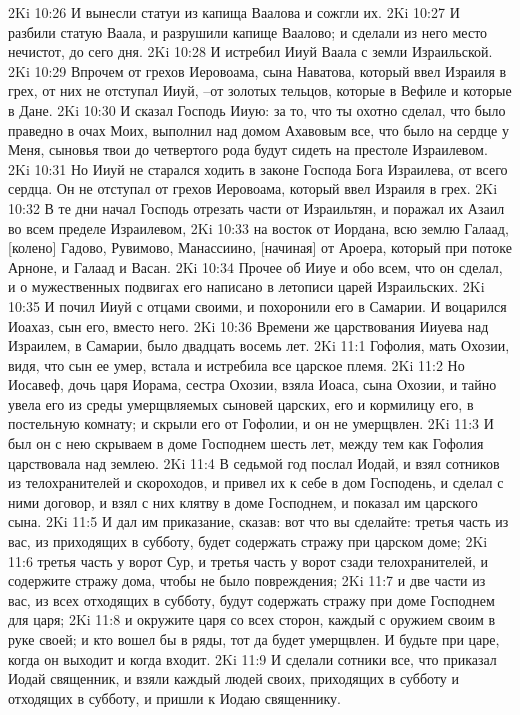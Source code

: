 2Ki 10:26  И вынесли статуи из капища Ваалова и сожгли их.
2Ki 10:27  И разбили статую Ваала, и разрушили капище Ваалово; и сделали из него место нечистот, до сего дня.
2Ki 10:28  И истребил Ииуй Ваала с земли Израильской.
2Ki 10:29  Впрочем от грехов Иеровоама, сына Наватова, который ввел Израиля в грех, от них не отступал Ииуй, --от золотых тельцов, которые в Вефиле и которые в Дане.
2Ki 10:30  И сказал Господь Ииую: за то, что ты охотно сделал, что было праведно в очах Моих, выполнил над домом Ахавовым все, что было на сердце у Меня, сыновья твои до четвертого рода будут сидеть на престоле Израилевом.
2Ki 10:31  Но Ииуй не старался ходить в законе Господа Бога Израилева, от всего сердца. Он не отступал от грехов Иеровоама, который ввел Израиля в грех.
2Ki 10:32  В те дни начал Господь отрезать части от Израильтян, и поражал их Азаил во всем пределе Израилевом,
2Ki 10:33  на восток от Иордана, всю землю Галаад, [колено] Гадово, Рувимово, Манассиино, [начиная] от Ароера, который при потоке Арноне, и Галаад и Васан.
2Ki 10:34  Прочее об Ииуе и обо всем, что он сделал, и о мужественных подвигах его написано в летописи царей Израильских.
2Ki 10:35  И почил Ииуй с отцами своими, и похоронили его в Самарии. И воцарился Иоахаз, сын его, вместо него.
2Ki 10:36  Времени же царствования Ииуева над Израилем, в Самарии, было двадцать восемь лет.
2Ki 11:1  Гофолия, мать Охозии, видя, что сын ее умер, встала и истребила все царское племя.
2Ki 11:2  Но Иосавеф, дочь царя Иорама, сестра Охозии, взяла Иоаса, сына Охозии, и тайно увела его из среды умерщвляемых сыновей царских, его и кормилицу его, в постельную комнату; и скрыли его от Гофолии, и он не умерщвлен.
2Ki 11:3  И был он с нею скрываем в доме Господнем шесть лет, между тем как Гофолия царствовала над землею.
2Ki 11:4  В седьмой год послал Иодай, и взял сотников из телохранителей и скороходов, и привел их к себе в дом Господень, и сделал с ними договор, и взял с них клятву в доме Господнем, и показал им царского сына.
2Ki 11:5  И дал им приказание, сказав: вот что вы сделайте: третья часть из вас, из приходящих в субботу, будет содержать стражу при царском доме;
2Ki 11:6  третья часть у ворот Сур, и третья часть у ворот сзади телохранителей, и содержите стражу дома, чтобы не было повреждения;
2Ki 11:7  и две части из вас, из всех отходящих в субботу, будут содержать стражу при доме Господнем для царя;
2Ki 11:8  и окружите царя со всех сторон, каждый с оружием своим в руке своей; и кто вошел бы в ряды, тот да будет умерщвлен. И будьте при царе, когда он выходит и когда входит.
2Ki 11:9  И сделали сотники все, что приказал Иодай священник, и взяли каждый людей своих, приходящих в субботу и отходящих в субботу, и пришли к Иодаю священнику.
